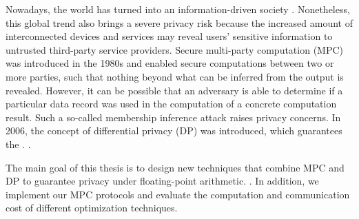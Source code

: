 Nowadays, the world has turned into an information-driven society . Nonetheless, this global trend also brings a severe privacy risk because the increased amount of interconnected devices and services may reveal users' sensitive information to untrusted third-party service providers. Secure multi-party computation (MPC) was introduced in the 1980s and enabled secure computations between two or more parties, such that nothing beyond what can be inferred from the output is revealed. However, it can be possible that an adversary is able to determine if a particular data record was used in the computation of a concrete computation result. Such a so-called membership inference attack raises privacy concerns. In 2006, the concept of differential privacy (DP) was introduced, which guarantees the . . 


The main goal of this thesis is to design new techniques that combine MPC and DP to guarantee privacy under floating-point arithmetic. . In addition, we implement our MPC protocols and evaluate the computation and communication cost of different optimization techniques.